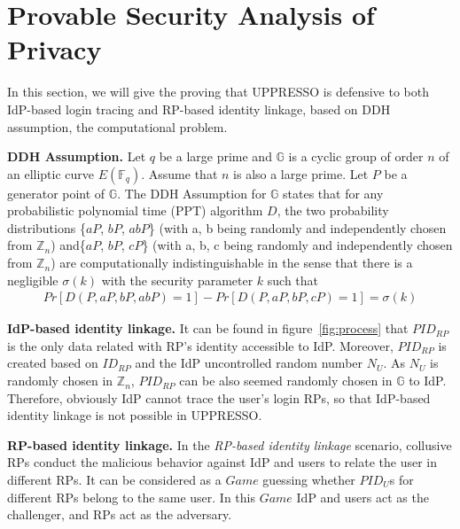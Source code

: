 \section{Provable Security Analysis of Privacy}
\label{sec:privacy}


In this section, we will give the proving that UPPRESSO is defensive to both IdP-based login tracing and RP-based identity linkage, based on DDH assumption\cite{GoldwasserK16}, the computational problem. 


\noindent\textbf{DDH Assumption.}
Let $q$ be a large prime and
$\mathbb{G}$ is a  cyclic group of order $n$ of an elliptic curve $E(\mathbb{F}_q)$. 
Assume that $n$ is also a large prime. Let $P$ be a generator point of $\mathbb{G}$. The DDH Assumption for $\mathbb{G}$ states that for any probabilistic polynomial time (PPT) algorithm $D$, the two probability distributions \{$aP$, $bP$, $abP$\} (with a, b being randomly and independently chosen from $\mathbb{Z}_n$) and\{$aP$, $bP$, $cP$\} (with a, b, c being randomly and independently chosen from $\mathbb{Z}_n$) are computationally indistinguishable in the sense that there is a negligible $\sigma(k)$ with the security parameter $k$ such that
\vspace{-\topsep}
\begin{multline*}
Pr[D(P, aP, bP, abP)=1]-Pr[D(P, aP, bP, cP)=1]=\sigma(k)
\end{multline*}

\vspace{-\topsep}

\noindent\textbf{IdP-based identity linkage.} 
It can be found in figure~\ref{fig:process} that $PID_{RP}$ is the only data related with RP's identity accessible to IdP. Moreover, $PID_{RP}$ is created based on $ID_{RP}$ and the IdP uncontrolled random number $N_U$. As $N_U$ is randomly chosen in $\mathbb{Z}_n$,  $PID_{RP}$ can be also seemed  randomly chosen in $\mathbb{G}$ to IdP. Therefore, obviously IdP cannot trace the user's login RPs, so that IdP-based identity linkage is not possible in UPPRESSO.

\noindent\textbf{RP-based identity linkage.} 
In the \emph{RP-based identity linkage} scenario, collusive RPs conduct the malicious behavior against IdP and users to relate the user in different RPs. It can be considered as a $Game$ guessing whether $PID_U$s for different RPs belong to the same user.  In this $Game$ IdP and users act as the challenger, and RPs act as the adversary. 

